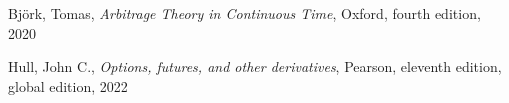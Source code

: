 \clearpage
{}

\begin{thebibliography}{25}
 Björk, Tomas,
 \emph{Arbitrage Theory in Continuous Time},
 Oxford, fourth edition, 2020

Hull, John C., 
\emph{Options, futures, and other derivatives},
Pearson, eleventh edition, global edition, 2022
 
\end{thebibliography}

